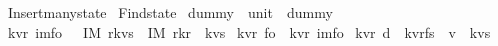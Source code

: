 %
\begin{isabellebody}%
%
%
\isadelimtheory
%
\endisadelimtheory
%
\isatagtheory
{}\isamarkupfalse%
\ Insert{\isacharunderscore}many{\isacharunderscore}state\isanewline
{}\ Find{\isacharunderscore}state\isanewline
{}%
\endisatagtheory
{\isafoldtheory}%
%
\isadelimtheory
\isanewline
%
\endisadelimtheory
\isanewline
\isanewline
\isanewline
{}\isamarkupfalse%
\ dummy\ {\isacharcolon}{\isacharcolon}\ {\isachardoublequoteopen}unit{\isachardoublequoteclose}\ \ {\isachardoublequoteopen}dummy{\isacharequal}{\isacharparenleft}{\isacharparenright}{\isachardoublequoteclose}\isanewline
\isanewline
\isanewline
\isanewline
{}\isamarkupfalse%
\ {\isacharparenleft}{\isacharprime}k{\isacharcomma}{\isacharprime}v{\isacharcomma}{\isacharprime}r{\isacharparenright}\ im{\isacharunderscore}fo\ \ {\isacharequal}\ IM{}\ {\isachardoublequoteopen}{\isacharprime}r{\isacharasterisk}{\isacharparenleft}{\isacharprime}k{\isacharasterisk}{\isacharprime}v{\isacharparenright}s{\isachardoublequoteclose}\ {\isacharbar}\ IM{}\ {\isachardoublequoteopen}{\isacharparenleft}{\isacharprime}r{\isacharasterisk}{\isacharprime}k{\isacharasterisk}{\isacharprime}r{\isacharparenright}\ {\isacharasterisk}\ {\isacharparenleft}{\isacharprime}k{\isacharasterisk}{\isacharprime}v{\isacharparenright}s{\isachardoublequoteclose}\isanewline
\isanewline
{}\isamarkupfalse%
\ {\isacharparenleft}{\isacharprime}k{\isacharcomma}{\isacharprime}v{\isacharcomma}{\isacharprime}r{\isacharparenright}\ fo\ {\isacharequal}\ {\isachardoublequoteopen}{\isacharparenleft}{\isacharprime}k{\isacharcomma}{\isacharprime}v{\isacharcomma}{\isacharprime}r{\isacharparenright}\ im{\isacharunderscore}fo{\isachardoublequoteclose}\isanewline
\isanewline
{}\isamarkupfalse%
\ {\isacharparenleft}{\isacharprime}k{\isacharcomma}{\isacharprime}v{\isacharcomma}{\isacharprime}r{\isacharparenright}\ d\ {\isacharequal}\ {\isachardoublequoteopen}{\isacharparenleft}{\isacharprime}k{\isacharcomma}{\isacharprime}v{\isacharcomma}{\isacharprime}r{\isacharparenright}fs\ {\isacharasterisk}\ {\isacharparenleft}{\isacharprime}v\ {\isacharasterisk}\ {\isacharparenleft}{\isacharprime}k{\isacharasterisk}{\isacharprime}v{\isacharparenright}s{\isacharparenright}{\isachardoublequoteclose}\isanewline
\isanewline
{}\isamarkupfalse%

\end{isabellebody}

